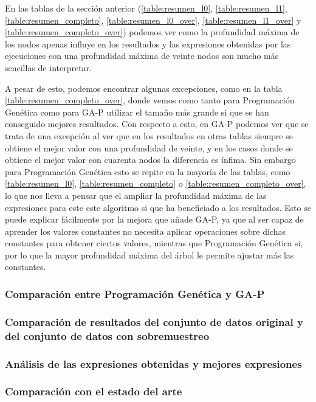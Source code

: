En las tablas de la sección anterior (\ref{table:resumen_l0}, \ref{table:resumen_l1}, \ref{table:resumen_completo}, \ref{table:resumen_l0_over}, \ref{table:resumen_l1_over} y \ref{table:resumen_completo_over}) podemos ver como la profundidad máxima de los nodos apenas influye en los resultados y las expresiones obtenidas por las ejecuciones con una profundidad máxima de veinte nodos son mucho más sencillas de interpretar.

A pesar de esto, podemos encontrar algunas excepciones, como en la tabla \ref{table:resumen_completo_over}, donde vemos como tanto para Programación Genética como para GA-P utilizar el tamaño más grande si que se han conseguido mejores resultados. Con respecto a esto, en GA-P podemos ver que se trata de una excepción al ver que en los resultados en otras tablas siempre se obtiene el mejor valor con una profundidad de veinte, y en los casos donde se obtiene el mejor valor con cuarenta nodos la diferencia es ínfima. Sin embargo para Programación Genética esto se repite en la mayoría de las tablas, como \ref{table:resumen_l0}, \ref{table:resumen_completo} o \ref{table:resumen_completo_over}, lo que nos lleva a pensar que el ampliar la profundidad máxima de las expresiones para este este algoritmo si que ha beneficiado a los resultados. Esto se puede explicar fácilmente por la mejora que añade GA-P, ya que al ser capaz de aprender los valores constantes no necesita aplicar operaciones sobre dichas constantes para obtener ciertos valores, mientras que Programación Genética si, por lo que la mayor profundidad máxima del árbol le permite ajustar más las constantes.

\subsubsection{Comparación entre Programación Genética y GA-P}

\subsubsection{Comparación de resultados del conjunto de datos original y del conjunto de datos con sobremuestreo}

\subsubsection{Análisis de las expresiones obtenidas y mejores expresiones}

\subsubsection{Comparación con el estado del arte}




\newpage
